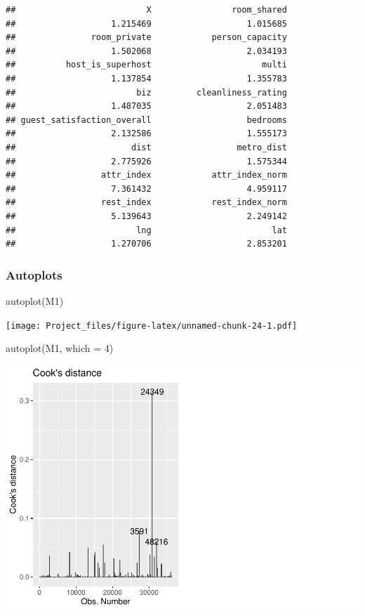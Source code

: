 \documentclass[
]{article}
\newenvironment{Shaded}{\begin{snugshade}}{\end{snugshade}}
\newcommand{\AttributeTok}[1]{\textcolor[rgb]{0.77,0.63,0.00}{#1}}
\newcommand{\DecValTok}[1]{\textcolor[rgb]{0.00,0.00,0.81}{#1}}
\newcommand{\FunctionTok}[1]{\textcolor[rgb]{0.00,0.00,0.00}{#1}}
\newcommand{\NormalTok}[1]{#1}
\begin{document}
\begin{verbatim}
##                          X                room_shared 
##                   1.215469                   1.015685 
##               room_private            person_capacity 
##                   1.502068                   2.034193 
##          host_is_superhost                      multi 
##                   1.137854                   1.355783 
##                        biz         cleanliness_rating 
##                   1.487035                   2.051483 
## guest_satisfaction_overall                   bedrooms 
##                   2.132586                   1.555173 
##                       dist                 metro_dist 
##                   2.775926                   1.575344 
##                 attr_index            attr_index_norm 
##                   7.361432                   4.959117 
##                 rest_index            rest_index_norm 
##                   5.139643                   2.249142 
##                        lng                        lat 
##                   1.270706                   2.853201
\end{verbatim}

\hypertarget{autoplots}{%
\subsubsection{Autoplots}\label{autoplots}}

\begin{Shaded}
\begin{Highlighting}[]
\FunctionTok{autoplot}\NormalTok{(M1)}
\end{Highlighting}
\end{Shaded}

\texttt{[image: Project\_files/figure-latex/unnamed-chunk-24-1.pdf]}

\begin{Shaded}
\begin{Highlighting}[]
\FunctionTok{autoplot}\NormalTok{(M1, }\AttributeTok{which =} \DecValTok{4}\NormalTok{)}
\end{Highlighting}
\end{Shaded}

\includegraphics{Project_files/figure-latex/unnamed-chunk-24-2.pdf}
\end{document}
